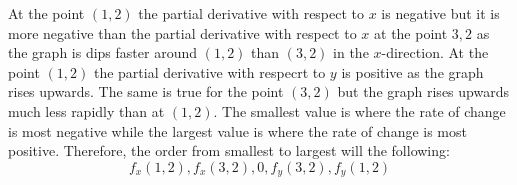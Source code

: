 \documentclass[12pt,letterpaper, onecolumn]{exam}
\begin{document}
\begin{questions}
		\begin{solution}
		 At the point $(1,2)$ the partial derivative with respect to $x$ is negative but it is more negative than the partial derivative with respect to $x$ at the point $3,2$ as the graph is dips faster around $(1,2)$ than $(3,2)$ in the $x$-direction. At the point $(1,2)$ the partial derivative with respecrt to $y$ is positive as the graph rises upwards. The same is true for the point $(3,2)$ but the graph rises upwards much less rapidly than at $(1,2)$. The smallest value is where the rate of change is most negative while the largest value is where the rate of change is most positive. Therefore, the order from smallest to largest will the following:
		 $$f_x(1,2),f_x(3,2),0,f_y(3,2),f_y(1,2)$$
		\end{solution}
	\end{questions}
\end{document}

